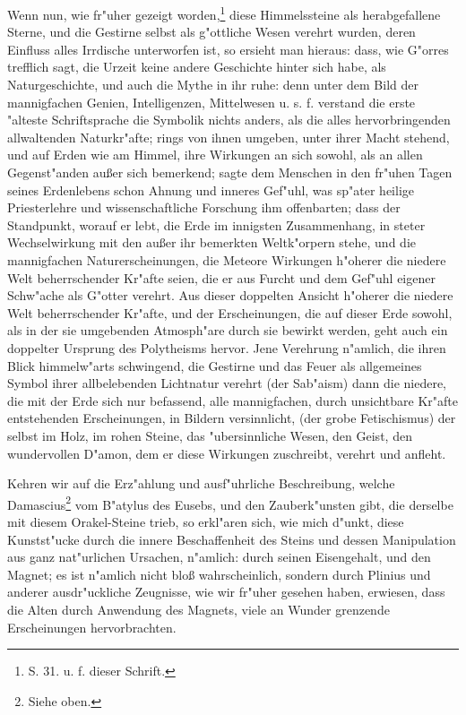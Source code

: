 \documentclass[a4paper, 11pt, oneside, polutonikogreek, german]{article}
\begin{document}
Wenn nun, wie fr"uher gezeigt worden,\footnote{S. 31. u. f. dieser Schrift.} diese Himmelssteine als herabgefallene Sterne, und die Gestirne selbst als g"ottliche Wesen verehrt wurden, deren Einfluss alles Irrdische unterworfen ist, so ersieht man hieraus: dass, wie G"orres trefflich sagt, die Urzeit keine andere Geschichte hinter sich habe, als Naturgeschichte, und auch die Mythe in ihr ruhe: denn unter dem Bild der mannigfachen Genien, Intelligenzen, Mittelwesen u. s. f. verstand die erste "alteste Schriftsprache die Symbolik nichts anders, als die alles hervorbringenden allwaltenden Naturkr"afte; rings von ihnen umgeben, unter ihrer Macht stehend, und auf Erden wie am Himmel, ihre Wirkungen an sich sowohl, als an allen Gegenst"anden außer sich bemerkend; sagte dem Menschen in den fr"uhen Tagen seines Erdenlebens schon Ahnung und inneres Gef"uhl, was sp"ater heilige Priesterlehre und wissenschaftliche Forschung ihm offenbarten; dass der Standpunkt, worauf er lebt, die Erde im innigsten Zusammenhang, in steter Wechselwirkung mit den außer ihr bemerkten Weltk"orpern stehe, und die mannigfachen Naturerscheinungen, die Meteore Wirkungen h"oherer die niedere Welt beherrschender Kr"afte seien, die er aus Furcht und dem Gef"uhl eigener Schw"ache als G"otter verehrt. Aus dieser doppelten Ansicht h"oherer die niedere Welt beherrschender Kr"afte, und der Erscheinungen, die auf dieser Erde sowohl, als in der sie umgebenden Atmosph"are durch sie bewirkt werden, geht auch ein doppelter Ursprung des Polytheisms hervor. Jene Verehrung n"amlich, die ihren Blick himmelw"arts schwingend, die Gestirne und das Feuer als allgemeines Symbol ihrer allbelebenden Lichtnatur verehrt (der Sab"aism) dann die niedere, die mit der Erde sich nur befassend, alle mannigfachen, durch unsichtbare Kr"afte entstehenden Erscheinungen, in Bildern versinnlicht, (der grobe Fetischismus) der selbst im Holz, im rohen Steine, das "ubersinnliche Wesen, den Geist, den wundervollen D"amon, dem er diese Wirkungen zuschreibt, verehrt und anfleht.

Kehren wir auf die Erz"ahlung und ausf"uhrliche Beschreibung, welche Damascius\footnote{Siehe oben.} vom B"atylus des Eusebs, und den Zauberk"unsten gibt, die derselbe mit diesem Orakel-Steine trieb, so erkl"aren sich, wie mich d"unkt, diese Kunstst"ucke durch die innere Beschaffenheit des Steins und dessen Manipulation aus ganz nat"urlichen Ursachen, n"amlich: durch seinen Eisengehalt, und den Magnet; es ist n"amlich nicht bloß wahrscheinlich, sondern durch Plinius und anderer ausdr"uckliche Zeugnisse, wie wir fr"uher gesehen haben, erwiesen, dass die Alten durch Anwendung des Magnets, viele an Wunder grenzende Erscheinungen hervorbrachten.
\end{document}
